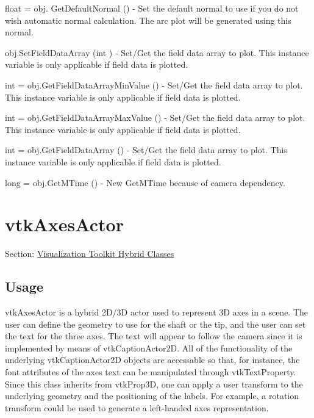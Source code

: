 \begin{DoxyItemize}
\item {\ttfamily float = obj. Get\-Default\-Normal ()} -\/ Set the default normal to use if you do not wish automatic normal calculation. The arc plot will be generated using this normal.  
\item {\ttfamily obj.\-Set\-Field\-Data\-Array (int )} -\/ Set/\-Get the field data array to plot. This instance variable is only applicable if field data is plotted.  
\item {\ttfamily int = obj.\-Get\-Field\-Data\-Array\-Min\-Value ()} -\/ Set/\-Get the field data array to plot. This instance variable is only applicable if field data is plotted.  
\item {\ttfamily int = obj.\-Get\-Field\-Data\-Array\-Max\-Value ()} -\/ Set/\-Get the field data array to plot. This instance variable is only applicable if field data is plotted.  
\item {\ttfamily int = obj.\-Get\-Field\-Data\-Array ()} -\/ Set/\-Get the field data array to plot. This instance variable is only applicable if field data is plotted.  
\item {\ttfamily long = obj.\-Get\-M\-Time ()} -\/ New Get\-M\-Time because of camera dependency.  
\end{DoxyItemize}\hypertarget{vtkhybrid_vtkaxesactor}{}\section{vtk\-Axes\-Actor}\label{vtkhybrid_vtkaxesactor}
Section\-: \hyperlink{sec_vtkhybrid}{Visualization Toolkit Hybrid Classes} \hypertarget{vtkwidgets_vtkxyplotwidget_Usage}{}\subsection{Usage}\label{vtkwidgets_vtkxyplotwidget_Usage}
vtk\-Axes\-Actor is a hybrid 2\-D/3\-D actor used to represent 3\-D axes in a scene. The user can define the geometry to use for the shaft or the tip, and the user can set the text for the three axes. The text will appear to follow the camera since it is implemented by means of vtk\-Caption\-Actor2\-D. All of the functionality of the underlying vtk\-Caption\-Actor2\-D objects are accessable so that, for instance, the font attributes of the axes text can be manipulated through vtk\-Text\-Property. Since this class inherits from vtk\-Prop3\-D, one can apply a user transform to the underlying geometry and the positioning of the labels. For example, a rotation transform could be used to generate a left-\/handed axes representation.

